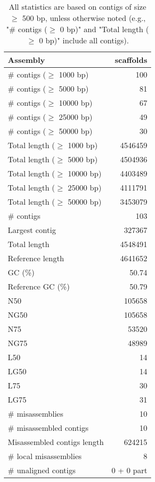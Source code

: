 \documentclass[12pt,a4paper]{article}
\begin{document}
\begin{table}[ht]
\begin{center}
\caption{All statistics are based on contigs of size $\geq$ 500 bp, unless otherwise noted (e.g., "\# contigs ($\geq$ 0 bp)" and "Total length ($\geq$ 0 bp)" include all contigs).}
\begin{tabular}{|l*{1}{|r}|}
\hline
Assembly & scaffolds \\ \hline
\# contigs ($\geq$ 1000 bp) & 100 \\ \hline
\# contigs ($\geq$ 5000 bp) & 81 \\ \hline
\# contigs ($\geq$ 10000 bp) & 67 \\ \hline
\# contigs ($\geq$ 25000 bp) & 49 \\ \hline
\# contigs ($\geq$ 50000 bp) & 30 \\ \hline
Total length ($\geq$ 1000 bp) & 4546459 \\ \hline
Total length ($\geq$ 5000 bp) & 4504936 \\ \hline
Total length ($\geq$ 10000 bp) & 4403489 \\ \hline
Total length ($\geq$ 25000 bp) & 4111791 \\ \hline
Total length ($\geq$ 50000 bp) & 3453079 \\ \hline
\# contigs & 103 \\ \hline
Largest contig & 327367 \\ \hline
Total length & 4548491 \\ \hline
Reference length & 4641652 \\ \hline
GC (\%) & 50.74 \\ \hline
Reference GC (\%) & 50.79 \\ \hline
N50 & 105658 \\ \hline
NG50 & 105658 \\ \hline
N75 & 53520 \\ \hline
NG75 & 48989 \\ \hline
L50 & 14 \\ \hline
LG50 & 14 \\ \hline
L75 & 30 \\ \hline
LG75 & 31 \\ \hline
\# misassemblies & 10 \\ \hline
\# misassembled contigs & 10 \\ \hline
Misassembled contigs length & 624215 \\ \hline
\# local misassemblies & 8 \\ \hline
\# unaligned contigs & 0 + 0 part \\ \hline

\end{tabular}
\end{center}
\end{table}
\end{document}
